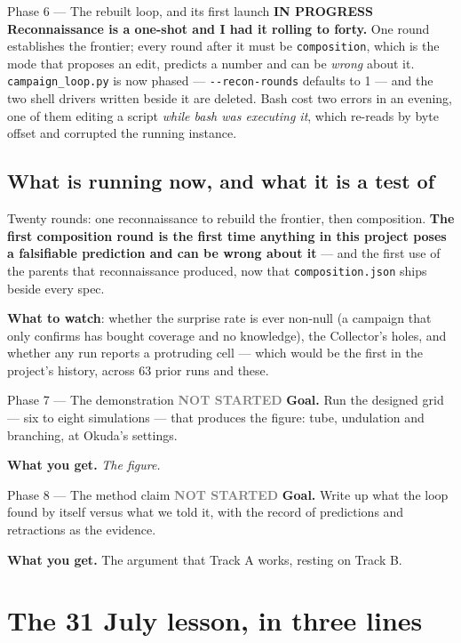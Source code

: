 \documentclass[11pt,a4paper]{article}
\newcommand{\code}[1]{\texttt{#1}}
\newcommand{\prog}{\textcolor{warn}{\textbf{IN PROGRESS}}}
\newcommand{\todo}{\textcolor{grey}{\textbf{NOT STARTED}}}
\begin{document}
\begin{phasebox}{Phase 6 --- The rebuilt loop, and its first launch \hfill \prog}
\textbf{Reconnaissance is a one-shot and I had it rolling to forty.} One round establishes the
frontier; every round after it must be \code{composition}, which is the mode that proposes an edit,
predicts a number and can be \emph{wrong} about it. \code{campaign\_loop.py} is now phased ---
\code{-{}-recon-rounds} defaults to 1 --- and the two shell drivers written beside it are deleted.
Bash cost two errors in an evening, one of them editing a script \emph{while bash was executing
it}, which re-reads by byte offset and corrupted the running instance.

\subsection*{What is running now, and what it is a test of}

Twenty rounds: one reconnaissance to rebuild the frontier, then composition. \textbf{The first
composition round is the first time anything in this project poses a falsifiable prediction and
can be wrong about it} --- and the first use of the parents that reconnaissance produced, now that
\code{composition.json} ships beside every spec.

\textbf{What to watch}: whether the surprise rate is ever non-null (a campaign that only confirms
has bought coverage and no knowledge), the Collector's holes, and whether any run reports a
protruding cell --- which would be the first in the project's history, across 63 prior runs and
these.
\end{phasebox}

\begin{phasebox}{Phase 7 --- The demonstration \hfill \todo}
\textbf{Goal.} Run the designed grid --- six to eight simulations --- that produces the figure:
tube, undulation and branching, at Okuda's settings.

\textbf{What you get.} \emph{The figure.}
\end{phasebox}

\begin{phasebox}{Phase 8 --- The method claim \hfill \todo}
\textbf{Goal.} Write up what the loop found by itself versus what we told it, with the record of
predictions and retractions as the evidence.

\textbf{What you get.} The argument that Track A works, resting on Track B.
\end{phasebox}

\section{The 31 July lesson, in three lines}
\end{document}
